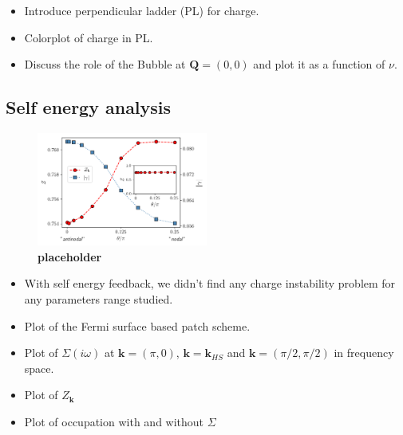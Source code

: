 \begin{itemize}

\item Introduce perpendicular ladder (PL) for charge.

\item Colorplot of charge in PL.

\item Discuss the role of the Bubble at $\boldsymbol{Q}=(0,0)$ and plot it as a function of $\nu$.

\end{itemize}

\subsection{Self energy analysis}

\begin{figure}
\includegraphics[width=0.5\textwidth]{images/z_and_gamma975.png}
\caption{\textbf{placeholder} }
\label{fig:zetaandgamma}
\end{figure}

\begin{itemize}

\item With self energy feedback, we didn't find any charge instability problem for any parameters range studied.

\item Plot of the Fermi surface based patch scheme.

\item Plot of $\Sigma(i\omega)$ at $\boldsymbol{k}=(\pi,0)$, $\boldsymbol{k}=\boldsymbol{k}_{HS}$ and $\boldsymbol{k}=(\pi/2,\pi/2)$ in frequency space.

\item Plot of $Z_{\boldsymbol{k}}$

\item Plot of occupation with and without $\Sigma$

\end{itemize}
